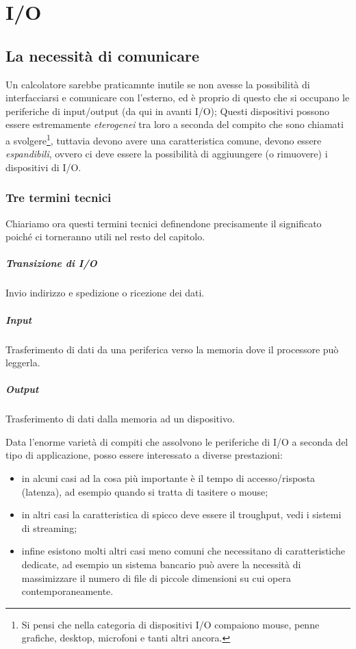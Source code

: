 \documentclass[class=book, crop=false, oneside]{standalone}
\begin{document}
\chapter{I/O}

\section{La necessità di comunicare}
Un calcolatore sarebbe praticamnte inutile se non avesse la possibilità di interfacciarsi e comunicare con l'esterno, ed è proprio di questo che si occupano le periferiche di input/output (da qui in avanti I/O); Questi dispositivi possono essere estremamente \emph{eterogenei} tra loro a seconda del compito che sono chiamati a svolgere\footnote{Si pensi che nella categoria di dispositivi I/O compaiono mouse, penne grafiche, desktop, microfoni e tanti altri ancora.}, tuttavia devono avere una caratteristica comune, devono essere \emph{espandibili}, ovvero ci deve essere la possibilità di aggiuungere (o rimuovere) i dispositivi di I/O.

\subsection*{Tre termini tecnici}
Chiariamo ora questi termini tecnici definendone precisamente il significato poiché ci torneranno utili nel resto del capitolo.
\paragraph{Transizione di I/O} Invio indirizzo e spedizione o ricezione dei dati.
\paragraph{Input} Trasferimento di dati da una periferica verso la memoria dove il processore può leggerla.
\paragraph{Output} Trasferimento di dati dalla memoria ad un dispositivo.

Data l'enorme varietà di compiti che assolvono le periferiche di I/O a  seconda del tipo di applicazione, posso essere interessato a diverse prestazioni:
\begin{itemize}
	\item in alcuni casi ad la cosa più importante è il tempo di accesso/risposta (latenza), ad esempio quando si tratta di tasitere o mouse;
	\item in altri casi la caratteristica di spicco deve essere il troughput, vedi i sistemi di streaming;
	\item infine esistono molti altri casi meno comuni che necessitano di caratteristiche dedicate, ad esempio un sistema bancario può avere la necessità di massimizzare il numero di file di piccole dimensioni su cui opera contemporaneamente.
\end{itemize}
\end{document}
